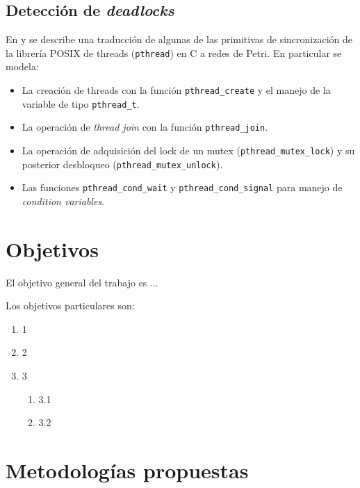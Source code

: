 \documentclass[12pt]{article}
\begin{document}
\subsection{Detección de \textit{deadlocks}}

En \cite{kavi-moshtaghi2002} y \cite{moshtaghi2001} se describe una traducción de algunas de las primitivas
de sincronización de la librería POSIX de threads (\texttt{pthread}) en C a redes de Petri.
En particular se modela:

\begin{itemize}
    \item La creación de threads con la función \texttt{pthread\_create} y el manejo de la variable de tipo \texttt{pthread\_t}.
    \item La operación de \textit{thread join} con la función \texttt{pthread\_join}.
    \item La operación de adquisición del lock de un mutex (\texttt{pthread\_mutex\_lock}) y su posterior desbloqueo (\texttt{pthread\_mutex\_unlock}).
    \item Las funciones \texttt{pthread\_cond\_wait} y \texttt{pthread\_cond\_signal} para manejo de \textit{condition variables}.
\end{itemize}


\bigskip

\section{Objetivos}

El objetivo general del trabajo es ...

Los objetivos particulares son:

\begin{enumerate}
    \item 1
    \item 2
    \item 3
          \begin{enumerate}
              \item 3.1
              \item 3.2
          \end{enumerate}
\end{enumerate}

\bigskip

\section{Metodologías propuestas}
\end{document}
